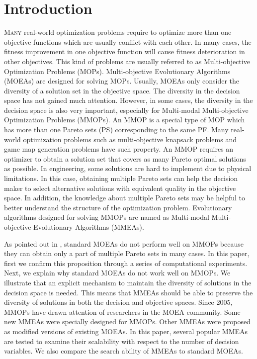 \documentclass[conference]{IEEEtran}
\begin{document}
\section{Introduction}
\lettrine[lines=2]{M}{any} real-world optimization problems require to optimize more than one objective functions which are usually conflict with each other. In many cases, the fitness improvement in one objective function will cause fitness deterioration in other objectives. This kind of problems are usually referred to as Multi-objective Optimization Problems (MOPs). Multi-objective Evolutionary Algorithms (MOEAs) are designed for solving MOPs. Usually, MOEAs only consider the diversity of a solution set in the objective space. The diversity in the decision space has not gained much attention. However, in some cases, the diversity in the decision space is also very important, especially for Multi-modal Multi-objective Optimization Problems (MMOPs). An MMOP is a special type of MOP which has more than one Pareto sets (PS) corresponding to the same PF. Many real-world optimization problems such as multi-objective knapsack problems \cite{jaszkiewicz2002performance} and game map generation problems \cite{togelius2010towards} have such property. An MMOP requires an optimizer to obtain a solution set that covers as many Pareto optimal solutions as possible. In engineering, some solutions are hard to implement due to physical limitations. In this case, obtaining multiple Pareto sets can help the decision maker to select alternative solutions with equivalent quality in the objective space. In addition, the knowledge about multiple Pareto sets may be helpful to better understand the structure of the optimization problem\cite{deb2001multi}. Evolutionary algorithms designed for solving MMOPs are named as Multi-modal Multi-objective Evolutionary Algorithms (MMEAs).

As pointed out in \cite{tanabe2019review} \cite{liang2016multimodal}, standard MOEAs do not perform well on MMOPs because they can obtain only a part of multiple Pareto sets in many cases. In this paper, first we confirm this proposition through a series of computational experiments. Next, we explain why standard MOEAs do not work well on MMOPs. We illustrate that an explicit mechanism to maintain the diversity of solutions in the decision space is needed. This means that MMEAs should be able to preserve the diversity of solutions in both the decision and objective spaces. Since 2005, MMOPs have drawn attention of researchers in the MOEA community. Some new MMEAs were specially designed for MMOPs. Other MMEAs were proposed as modified versions of existing MOEAs. In this paper, several popular MMEAs are tested to examine their scalability with respect to the number of decision variables. We also compare the search ability of MMEAs to standard MOEAs.
\end{document}

